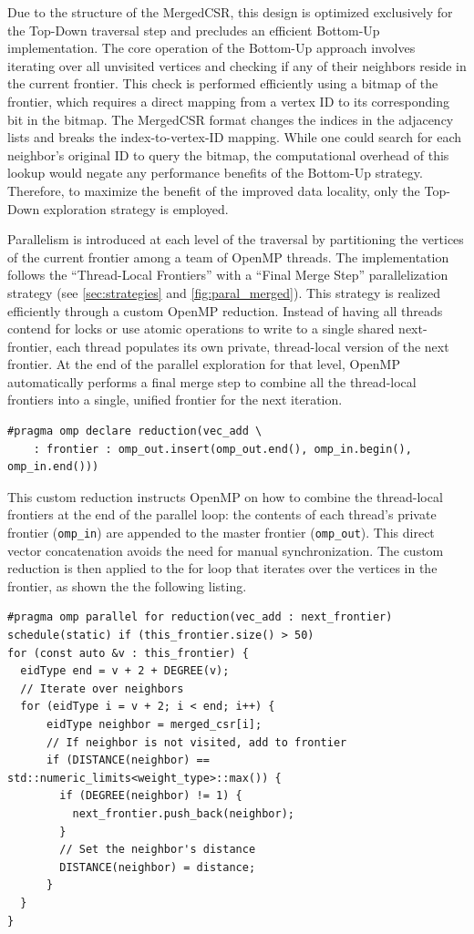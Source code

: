 Due to the structure of the MergedCSR, this design is optimized exclusively for the Top-Down traversal step and precludes an efficient Bottom-Up implementation. The core operation of the Bottom-Up approach involves iterating over all unvisited vertices and checking if any of their neighbors reside in the current frontier. This check is performed efficiently using a bitmap of the frontier, which requires a direct mapping from a vertex ID to its corresponding bit in the bitmap. The MergedCSR format changes the indices in the adjacency lists and breaks the index-to-vertex-ID mapping. While one could search for each neighbor's original ID to query the bitmap, the computational overhead of this  lookup would negate any performance benefits of the Bottom-Up strategy. Therefore, to maximize the benefit of the improved data locality, only the Top-Down exploration strategy is employed.

Parallelism is introduced at each level of the traversal by partitioning the vertices of the current frontier among a team of OpenMP threads. The implementation follows the ``Thread-Local Frontiers'' with a ``Final Merge Step'' parallelization strategy (see \cref{sec:strategies} and \cref{fig:paral_merged}). This strategy is realized efficiently through a custom OpenMP reduction. Instead of having all threads contend for locks or use atomic operations to write to a single shared next-frontier, each thread populates its own private, thread-local version of the next frontier. At the end of the parallel exploration for that level, OpenMP automatically performs a final merge step to combine all the thread-local frontiers into a single, unified frontier for the next iteration.
\begin{verbatim}
#pragma omp declare reduction(vec_add \
    : frontier : omp_out.insert(omp_out.end(), omp_in.begin(), omp_in.end()))
\end{verbatim}
This custom reduction instructs OpenMP on how to combine the thread-local frontiers at the end of the parallel loop: the contents of each thread's private frontier (\texttt{omp\_in}) are appended to the master frontier (\texttt{omp\_out}). This direct vector concatenation avoids the need for manual synchronization. The custom reduction is then applied to the for loop that iterates over the vertices in the frontier, as shown the the following listing.
\begin{verbatim}
#pragma omp parallel for reduction(vec_add : next_frontier) schedule(static) if (this_frontier.size() > 50)
for (const auto &v : this_frontier) {
  eidType end = v + 2 + DEGREE(v);
  // Iterate over neighbors
  for (eidType i = v + 2; i < end; i++) {
      eidType neighbor = merged_csr[i];
      // If neighbor is not visited, add to frontier
      if (DISTANCE(neighbor) == std::numeric_limits<weight_type>::max()) {
        if (DEGREE(neighbor) != 1) {
          next_frontier.push_back(neighbor);
        }
        // Set the neighbor's distance
        DISTANCE(neighbor) = distance;
      }
  }
}
\end{verbatim}


